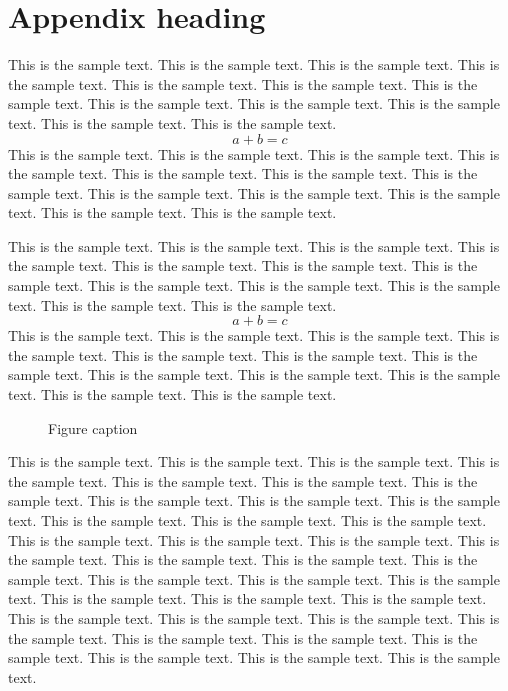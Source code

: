 \documentclass[preprint,pteplogo]{ptephy_v2}%
\begin{document}
\section{Appendix heading}
This is the sample text. This is the sample text. This is the sample text. This is the sample text.
This is the sample text. This is the sample text. This is the sample text. This is the sample text.
This is the sample text. This is the sample text. This is the sample text. This is the sample text.
\begin{equation}
a + b = c
\end{equation}
This is the sample text. This is the sample text. This is the sample text. This is the sample text.
This is the sample text. This is the sample text. This is the sample text. This is the sample text.
This is the sample text. This is the sample text. This is the sample text. This is the sample text.

This is the sample text. This is the sample text. This is the sample text. This is the sample text.
This is the sample text. This is the sample text. This is the sample text. This is the sample text.
This is the sample text. This is the sample text. This is the sample text. This is the sample text.
\begin{equation}
a + b = c
\end{equation}
This is the sample text. This is the sample text. This is the sample text. This is the sample text.
This is the sample text. This is the sample text. This is the sample text. This is the sample text.
This is the sample text. This is the sample text. This is the sample text. This is the sample text.

\begin{figure}[!h]
\caption{Figure caption}
\end{figure}

This is the sample text. This is the sample text. This is the sample text. This is the sample text.
This is the sample text. This is the sample text. This is the sample text. This is the sample text.
This is the sample text. This is the sample text. This is the sample text. This is the sample text.
This is the sample text. This is the sample text. This is the sample text. This is the sample text.
This is the sample text. This is the sample text. This is the sample text. This is the sample text.
This is the sample text. This is the sample text. This is the sample text. This is the sample text.
This is the sample text. This is the sample text. This is the sample text. This is the sample text.
This is the sample text. This is the sample text. This is the sample text. This is the sample text.
This is the sample text. This is the sample text. This is the sample text. This is the sample text.
\end{document}
